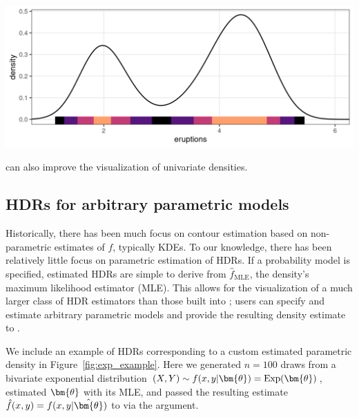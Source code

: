 \begin{knitrout}
\color{fgcolor}\begin{widefigure}[h!]

{\centering \includegraphics[width=\maxwidth]{figures/eval_misc_vis_2-1}

}

\caption{ can also improve the visualization of univariate densities.}\label{fig:eval_misc_vis_2}
\end{widefigure}

\end{knitrout}











\subsection{HDRs for arbitrary parametric models}\label{sec:parametric}
\label{hdr-fun}

Historically, there has been much focus on contour estimation based on non-parametric estimates of $f$, typically KDEs.
To our knowledge, there has been relatively little focus on parametric estimation of HDRs.
If a probability model is specified, estimated HDRs are simple to derive from $\hat{f}_{\mathrm{MLE}}$, the density's maximum likelihood estimator (MLE).
This allows for the visualization of a much larger class of HDR estimators than those built into ;
users can specify and estimate arbitrary parametric models and provide the resulting density estimate to .

We include an example of HDRs corresponding to a custom estimated parametric density in Figure~\ref{fig:exp_example}.
Here we generated $n = 100$ draws from a bivariate exponential distribution $(X,Y) \sim f(x,y|\bm{\th}) = \mathrm{Exp}(\bm{\th})$,
estimated $\bm{\th}$ with its MLE, and passed the resulting estimate $\hat{f}(x,y) = f(x,y|\hat{\bm{\th}})$ to  via the  argument.

